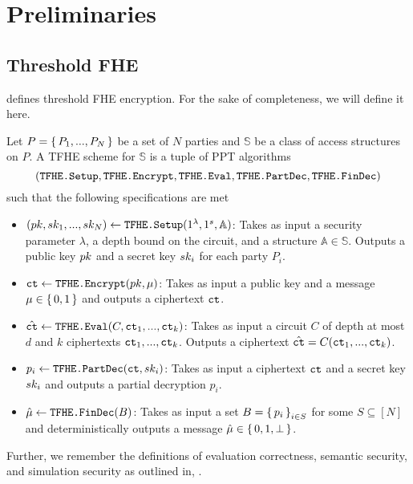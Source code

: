 \section{Preliminaries}
\subsection{Threshold FHE}
\cite{jain2017threshold,boneh2018threshold} defines threshold FHE encryption. For the sake of completeness, we will define it here.

\begin{definition}
	Let $P = \set{P_1, ..., P_N}$	 be a set of $N$ parties and $\mathbb{S}$ be a class of
	access structures on $P$. A TFHE scheme for $\mathbb{S}$ is a tuple of PPT algorithms
	$$
		(\texttt{TFHE.Setup}, \texttt{TFHE.Encrypt}, \texttt{TFHE.Eval}, \texttt{TFHE.PartDec}, \texttt{TFHE.FinDec})
	$$ such that the following specifications are met

	\begin{itemize}
		\item $(pk, sk_1, ..., sk_N) \gets \texttt{TFHE.Setup}(1^\lambda, 1^s, \mathbb{A})$:
		      Takes as input a security parameter $\lambda$, a depth bound on the circuit, and a structure $\mathbb{A} \in \mathbb{S}$.
		      Outputs a public key $pk$ and a secret key $sk_i$ for each party $P_i$.
		\item $\texttt{ct} \gets \texttt{TFHE.Encrypt}(pk, \mu)$: Takes as input a public key and a message $\mu \in \set{0, 1}$ and outputs a ciphertext $\texttt{ct}$.
		\item $\hat{\texttt{ct}} \gets \texttt{TFHE.Eval}(C, \texttt{ct}_1, ..., \texttt{ct}_k)$: Takes as input a circuit $C$ of depth at most $d$ and $k$ ciphertexts $\texttt{ct}_1, ..., \texttt{ct}_k$.
		      Outputs a ciphertext $\hat{\texttt{ct}} = C(\texttt{ct}_1, ..., \texttt{ct}_k)$.
		\item $p_i \gets \texttt{TFHE.PartDec}(\texttt{ct}, sk_i)$: Takes as input a ciphertext $\texttt{ct}$ and a secret key $sk_i$ and outputs a partial decryption $p_i$.
		\item $\hat\mu \gets \texttt{TFHE.FinDec}(B)$: Takes as input a set $B = \set{p_i}_{i \in S}$ for some $S \subseteq [N]$ and deterministically
		      outputs a message $\hat\mu \in \set{0, 1, \bot}$.
	\end{itemize}
\end{definition}

Further, we remember the definitions of evaluation correctness, semantic security, and simulation security as outlined in,
\cite{boneh2020single}.

